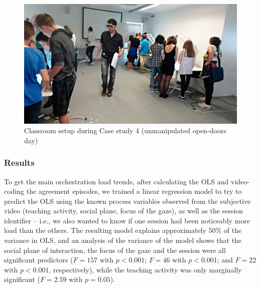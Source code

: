 \documentclass[10pt,journal,compsoc]{IEEEtran}
\begin{document}

\begin{figure}[!t]
\centering
\includegraphics[width=\linewidth]{Case4Picture}
\caption{Classroom setup during Case study 4 (unmanipulated open-doors day)}
\label{fig:case4picture}
\end{figure}

\subsubsection{Results}

To get the main orchestration load trends, after calculating the OLS and video-coding the agreement episodes, we trained a linear regression model to try to predict the OLS using the known process variables observed from the subjective video (teaching activity, social plane, focus of the gaze), as well as the session identifier -- i.e., we also wanted to know if one session had been noticeably more load than the others. The resulting model explains approximately 50\% of the variance in OLS,  and an analysis of the variance of the model shows that the social plane of interaction, the focus of the gaze and the session were all significant predictors ($F=157$ with $p<0.001$; $F=46$ with $p<0.001$; and $F=22$ with $p<0.001$, respectively), while the teaching activity was only marginally significant ($F=2.59$ with $p=0.05$).
\end{document}
